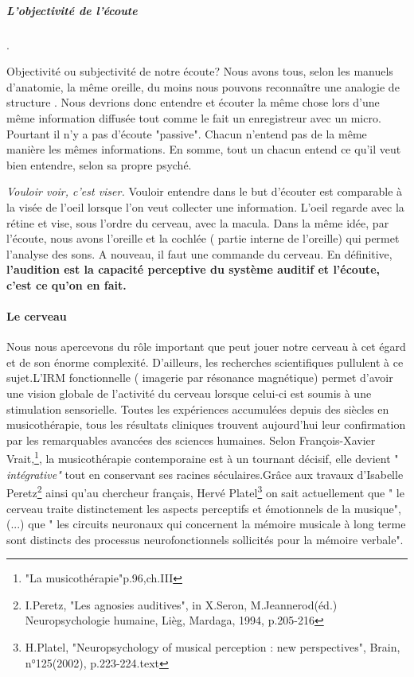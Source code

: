\subparagraph{L'objectivité de l'écoute}.

Objectivité ou subjectivité de notre écoute?  
Nous avons tous,
selon les manuels d'anatomie, la même
oreille, du moins nous pouvons reconnaître une analogie de structure . Nous devrions donc entendre et écouter la même chose
lors d'une même information diffusée tout comme le fait un enregistreur avec un micro. Pourtant il n'y a pas d'écoute "passive". Chacun n'entend pas de la même manière les mêmes
informations. En somme, tout un chacun entend ce qu'il veut bien
entendre, selon sa propre psyché. 

 \emph{Vouloir voir, c'est viser.}  Vouloir entendre dans le but d'écouter est comparable  à
la visée de l'oeil lorsque l'on veut collecter une information. L'oeil regarde avec la rétine et  vise, sous l'ordre du cerveau, avec la macula. Dans la même idée, par l'écoute, nous avons l'oreille et la cochlée ( partie interne de l'oreille) qui permet l'analyse des sons. A nouveau, il faut une commande du cerveau.
En définitive,\textbf{ l'audition est la capacité perceptive du système auditif et l'écoute, c'est ce qu'on en fait.}
\paragraph*{Le cerveau}
Nous nous apercevons du rôle important que peut jouer notre cerveau à cet égard et de son énorme complexité. 
D'ailleurs, les recherches scientifiques pullulent à ce sujet.L'IRM fonctionnelle ( imagerie par résonance magnétique)  permet d'avoir une vision globale de l'activité du cerveau lorsque celui-ci est soumis à une stimulation sensorielle. Toutes les expériences accumulées depuis des siècles en musicothérapie, tous les résultats cliniques trouvent aujourd'hui leur confirmation par les remarquables avancées des sciences humaines. Selon François-Xavier Vrait,\footnote{"La musicothérapie"p.96,ch.III}, la musicothérapie contemporaine est à un tournant décisif, elle devient " \textit{intégrative"} tout en conservant ses racines séculaires.Grâce aux travaux d'Isabelle Peretz\footnote{I.Peretz, "Les agnosies auditives", in X.Seron, M.Jeannerod(éd.) Neuropsychologie humaine, Lièg, Mardaga, 1994, p.205-216} ainsi qu'au chercheur français, Hervé Platel\footnote{H.Platel, "Neuropsychology of musical perception : new perspectives", Brain, n°125(2002), p.223-224.text} on sait actuellement que " le cerveau traite distinctement les aspects perceptifs et émotionnels de la musique",(...) que " les circuits neuronaux qui concernent la mémoire musicale à long terme sont distincts des processus neurofonctionnels sollicités pour la mémoire verbale".


